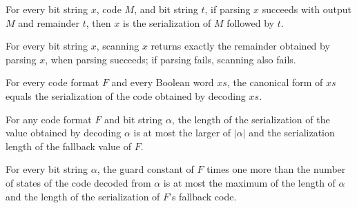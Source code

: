 \begin{theorem}
\label{Turing.CodeFormat.parseFull_sound}
\leanok
{}
For every bit string $x$, code $M$, and bit string $t$, if parsing $x$ succeeds with
output $M$ and remainder $t$, then $x$ is the serialization of $M$ followed by $t$.
\end{theorem}

\begin{theorem}
\label{Turing.CodeFormat.scan_full}
\leanok
{}
For every bit string $x$, scanning $x$ returns exactly the remainder obtained by parsing
$x$, when parsing succeeds; if parsing fails, scanning also fails.
\end{theorem}

\begin{theorem}
\label{Turing.CodeFormat.canonical_eq}
\leanok
{}
For every code format $F$ and every Boolean word $xs$, the canonical form of $xs$ equals
the serialization of the code obtained by decoding $xs$.
\end{theorem}

\begin{theorem}
\label{Turing.CodeFormat.serialize_decode_length_le}
\leanok
{}
For any code format $F$ and bit string $\alpha$, the length of the serialization of the
value obtained by decoding $\alpha$ is at most the larger of $|\alpha|$ and the
serialization length of the fallback value of $F$.
\end{theorem}

\begin{theorem}
\label{Turing.CodeFormat.numStates_decode_le}
\leanok
{}
For every bit string $\alpha$, the guard constant of $F$ times one more than the number
of states of the code decoded from $\alpha$ is at most the maximum of the length of
$\alpha$ and the length of the serialization of $F$'s fallback code.
\end{theorem}

